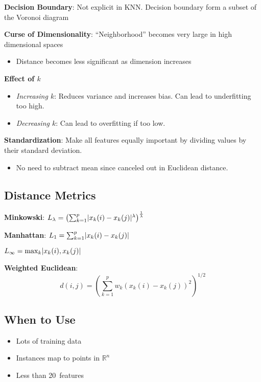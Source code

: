 \documentclass[10pt]{article}
\DeclarePairedDelimiter{\abs}{\lvert}{\rvert}
\begin{document}
\begin{multicols}{3}
  \textbf{Decision Boundary}: Not explicit in KNN\@. Decision boundary form a subset of the Voronoi diagram

  \textbf{Curse of Dimensionality}: ``Neighborhood'' becomes very large in high dimensional spaces
  \begin{itemize}
    \item Distance becomes less significant as dimension increases
  \end{itemize}

  \textbf{Effect of $k$}
  \begin{itemize}
    \item \textit{Increasing $k$}: Reduces variance and increases bias. Can lead to underfitting too high.
    \item \textit{Decreasing $k$}: Can lead to overfitting if too low.
  \end{itemize}

  \textbf{Standardization}: Make all features equally important by dividing values by their standard deviation.
  \begin{itemize}
    \item No need to subtract mean since canceled out in Euclidean distance.
  \end{itemize}

  \subsection*{Distance Metrics}
  \textbf{Minkowski}: $L_{\lambda} = \left( \sum_{k=1}^{p} \abs{x_k(i) - x_k(j)}^{\lambda}\right)^{\frac{1}{\lambda}}$

  \vspace{8pt}\textbf{Manhattan}: $L_1 = \sum_{k=1}^{p} \abs{x_k(i) - x_k(j)}$

  \vspace{8pt}$L_{\infty} = \max_{k}\abs{x_k(i),x_k(j)}$

  \vspace{8pt}\textbf{Weighted Euclidean}:
  \vspace{-4pt}
  \[ d(i,j) = \left( \sum_{k=1}^{p} w_k \left(x_k(i) - x_k(j)\right)^{2} \right)^{1/2} \]

  \subsection*{When to Use}
  \begin{itemize}
    \item Lots of training data
    \item Instances map to points in $\mathbb{R}^n$
    \item Less than 20~features
  \end{itemize}


\end{multicols}
\end{document}
